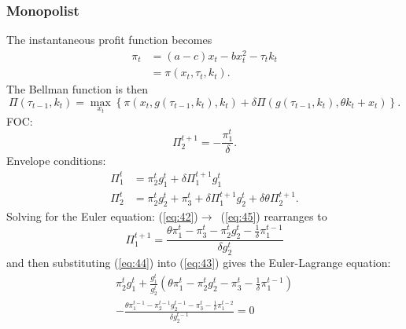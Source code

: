 \documentclass{amsart}
\begin{document}
\subsubsection{Monopolist}
\label{sec:monopolist-2}

The instantaneous profit function becomes
\begin{align}
  \label{eq:40}
  \pi_t &= (a-c)x_t - bx_t^2 - \tau_tk_t \\
  &= \pi(x_t,\tau_t,k_t).
\end{align}
The Bellman function is then
\begin{equation}
  \label{eq:41}
  \Pi(\tau_{t-1},k_t) = \max_{x_t} \left\{ \pi\left(
      x_t,g(\tau_{t-1},k_t),k_t\right) + \delta \Pi \left(
      g(\tau_{t-1},k_t), \theta k_t + x_t \right) \right\}.
\end{equation}
FOC:
\begin{equation}
  \label{eq:42}
  \Pi^{t+1}_2 = -\frac{\pi^t_1}\delta.
\end{equation}
Envelope conditions:
\begin{align}
  \label{eq:43}
  \Pi^t_1 &= \pi^t_2g^t_1 + \delta \Pi^{t+1}_1g^t_1 \\ \label{eq:45}
  \Pi^t_2 &= \pi^t_2g^t_2 + \pi^t_3 + \delta \Pi^{t+1}_1g^t_2 + \delta
  \theta \Pi^{t+1}_2.
\end{align}
Solving for the Euler equation:
(\ref{eq:42})$\rightarrow$~(\ref{eq:45}) rearranges to
\begin{equation}
  \label{eq:44}
  \Pi^{t+1}_1 = \frac{\theta \pi^t_1 - \pi^t_3 - \pi^t_2g^t_2 -
    \frac{1}\delta\pi^{t-1}_1}{\delta g^t_2}
\end{equation}
and then substituting (\ref{eq:44}) into (\ref{eq:43}) gives the
Euler-Lagrange equation:
\begin{multline}
  \label{eq:46}
  \pi^t_2g^t_1 + \frac{g^t_1}{g^t_2} \left( \theta \pi^t_1 -
    \pi^t_2g^t_2 - \pi^t_3 - \frac{1}\delta\pi^{t-1}_1 \right) \\ -
  \frac{\theta\pi^{t-1}_1 - \pi^{t-1}_2g^{t-1}_2 - \pi^t_3 -
    \frac{1}\delta\pi^{t-2}_1}{\delta g^{t-1}_2} = 0
\end{multline}
\end{document}

